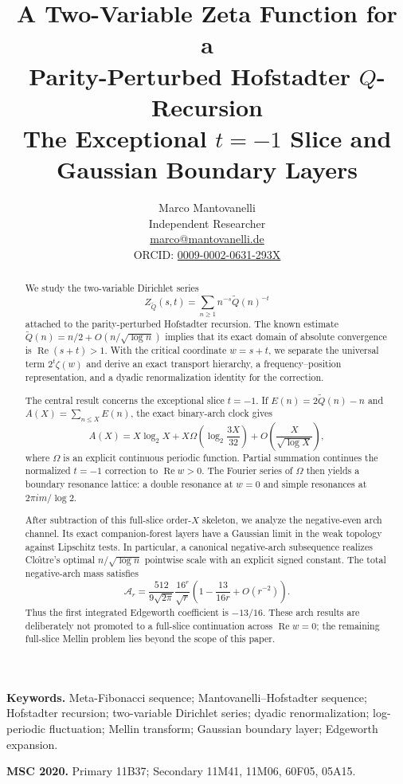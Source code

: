 \documentclass[11pt]{article}
\title{A Two-Variable Zeta Function for a\\
Parity-Perturbed Hofstadter \texorpdfstring{$Q$}{Q}-Recursion\\[1.5mm]
\large The Exceptional \texorpdfstring{$t=-1$}{t=-1} Slice and Gaussian Boundary Layers}
\author{Marco Mantovanelli\\
\small Independent Researcher\\
\small \href{mailto:marco@mantovanelli.de}{marco@mantovanelli.de}\\
\small ORCID: \href{https://orcid.org/0009-0002-0631-293X}{0009-0002-0631-293X}}
\date{}
\theoremstyle{definition}
\theoremstyle{remark}
\newcommand{\Qp}{\widetilde Q}
\newcommand{\RePart}{\operatorname{Re}}
\begin{document}
\maketitle

\begin{abstract}
We study the two-variable Dirichlet series
\[
 Z_{\Qp}(s,t)=\sum_{n\ge1}n^{-s}\Qp(n)^{-t}
\]
attached to the parity-perturbed Hofstadter recursion.  The known estimate
$\Qp(n)=n/2+O(n/\sqrt{\log n})$ implies that its exact domain of absolute
convergence is $\RePart(s+t)>1$.  With the critical coordinate $w=s+t$, we
separate the universal term $2^t\zeta(w)$ and derive an exact transport
hierarchy, a frequency--position representation, and a dyadic
renormalization identity for the correction.

The central result concerns the exceptional slice $t=-1$.  If
$E(n)=2\Qp(n)-n$ and $A(X)=\sum_{n\le X}E(n)$, the exact binary-arch clock
gives
\[
 A(X)=X\log_2X+X\Omega\!\left(\log_2\frac{3X}{32}\right)
       +O\!\left(\frac{X}{\sqrt{\log X}}\right),
\]
where $\Omega$ is an explicit continuous periodic function.  Partial
summation continues the normalized $t=-1$ correction to $\RePart w>0$.
The Fourier series of $\Omega$ then yields a boundary resonance lattice:
a double resonance at $w=0$ and simple resonances at
$2\pi i m/\log 2$.

After subtraction of this full-slice order-$X$ skeleton, we analyze the
negative-even arch channel.  Its exact companion-forest layers have a
Gaussian limit in the weak topology against Lipschitz tests.  In particular,
a canonical negative-arch subsequence realizes Clo\^{\i}tre's optimal
$n/\sqrt{\log n}$ pointwise scale with an explicit signed constant.  The
total negative-arch mass satisfies
\[
 \mathcal A_r=\frac{512}{9\sqrt{2\pi}}\frac{16^r}{\sqrt r}
 \left(1-\frac{13}{16r}+O(r^{-2})\right).
\]
Thus the first integrated Edgeworth coefficient is $-13/16$.  These arch
results are deliberately not promoted to a full-slice continuation across
$\RePart w=0$; the remaining full-slice Mellin problem lies beyond the scope
of this paper.
\end{abstract}

\noindent\textbf{Keywords.}
Meta-Fibonacci sequence; Mantovanelli--Hofstadter sequence; Hofstadter
recursion; two-variable Dirichlet series; dyadic renormalization;
log-periodic fluctuation; Mellin transform; Gaussian boundary layer;
Edgeworth expansion.

\medskip
\noindent\textbf{MSC 2020.}
Primary 11B37; Secondary 11M41, 11M06, 60F05, 05A15.
\end{document}
